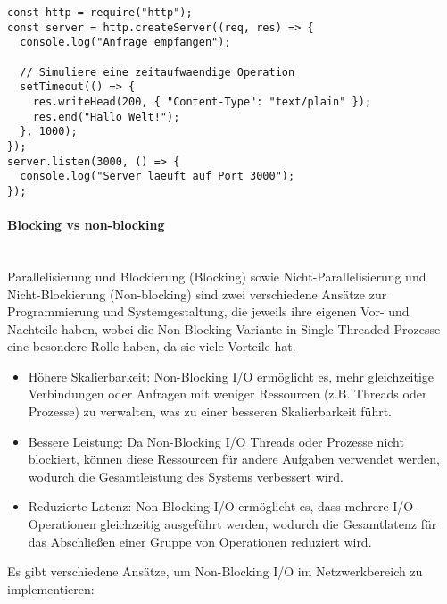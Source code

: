 \documentclass[../vs-script-first-v01.tex]{subfiles}
\begin{document}
\begin{lstlisting}[caption={Node.js Single Threaded},captionpos=b,label={lst:single}]
const http = require("http");
const server = http.createServer((req, res) => {
  console.log("Anfrage empfangen");

  // Simuliere eine zeitaufwaendige Operation
  setTimeout(() => {
    res.writeHead(200, { "Content-Type": "text/plain" });
    res.end("Hallo Welt!");
  }, 1000);
});
server.listen(3000, () => {
  console.log("Server laeuft auf Port 3000");
});
\end{lstlisting}

\paragraph{Blocking vs non-blocking\\\\}
Parallelisierung und Blockierung (Blocking) sowie Nicht-Parallelisierung und Nicht-Blockierung (Non-blocking) sind zwei verschiedene Ansätze zur Programmierung und Systemgestaltung, die jeweils ihre eigenen Vor- und Nachteile haben, wobei die Non-Blocking Variante in Single-Threaded-Prozesse eine besondere Rolle haben, da sie viele Vorteile hat. 
\begin{itemize}
\item Höhere Skalierbarkeit: Non-Blocking I/O ermöglicht es, mehr gleichzeitige Verbindungen oder Anfragen mit weniger Ressourcen (z.B. Threads oder Prozesse) zu verwalten, was zu einer besseren Skalierbarkeit führt.
\item Bessere Leistung: Da Non-Blocking I/O Threads oder Prozesse nicht blockiert, können diese Ressourcen für andere Aufgaben verwendet werden, wodurch die Gesamtleistung des Systems verbessert wird.
\item Reduzierte Latenz: Non-Blocking I/O ermöglicht es, dass mehrere I/O-Operationen gleichzeitig ausgeführt werden, wodurch die Gesamtlatenz für das Abschließen einer Gruppe von Operationen reduziert wird.
\end{itemize}
Es gibt verschiedene Ansätze, um Non-Blocking I/O im Netzwerkbereich zu implementieren:
\end{document}
